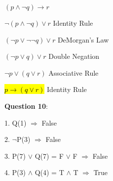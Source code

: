 \documentclass{article} %
\newcommand{\question}[2][]{\begin{flushleft}
        \textbf{Question #1}: \textit{#2}

\end{flushleft}}
\begin{document}
        $(p \land \neg q) \rightarrow r$

        $\neg(p \land \neg q) \lor r$ \tabto*{3.5cm} Identity Rule

        $(\neg p \lor \neg \neg q) \lor r$ \tabto*{3.5cm} DeMorgan's Law

        $(\neg p \lor q) \lor r$ \tabto*{3.5cm} Double Negation

        $\neg p \lor (q \lor r)$ \tabto*{3.5cm} Associative Rule

        \hl{$p \rightarrow (q \lor r)$} \tabto*{3.5cm} Identity Rule

    \question[10]{}

        1. Q(1) $\Rightarrow$ False

        2. $\neg$P(3) $\Rightarrow$ False

        3. P(7) $\lor$ Q(7) = F $\lor$ F $\Rightarrow$ False

        4. P(3) $\land$ Q(4) = T $\land$ T $\Rightarrow$ True
\end{document}
